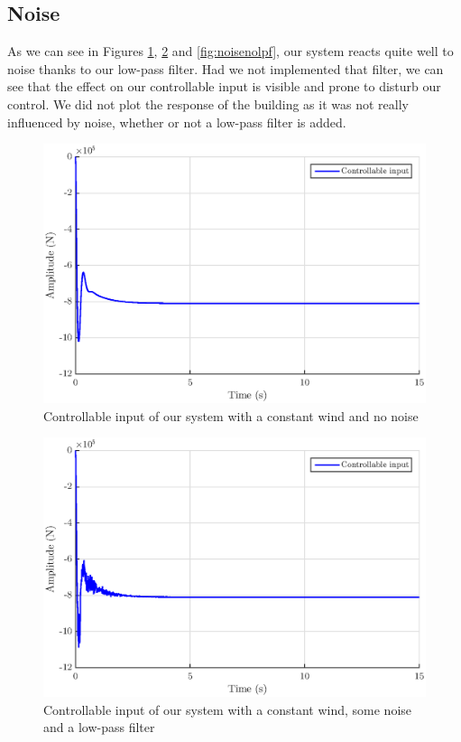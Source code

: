 \subsection{Noise}
As we can see in Figures \ref{fig:inputnonoise}, \ref{fig:noiselpf} and \ref{fig:noisenolpf}, our system reacts quite well to noise thanks to our low-pass filter. Had we not implemented that filter, we can see that the effect on our controllable input is visible and prone to disturb our control. We did not plot the response of the building as it was not really influenced by noise, whether or not a low-pass filter is added.
\begin{figure}[H]
    \centering
    \includegraphics[scale = 0.7]{resources/eps/input_nonoise.eps}
    \caption{Controllable input of our system with a constant wind and no noise}
    \label{fig:inputnonoise}
\end{figure}
\begin{figure}[H]
    \centering
    \includegraphics[scale = 0.7]{resources/eps/noise_lpf.eps}
    \caption{Controllable input of our system with a constant wind, some noise and a low-pass filter}
    \label{fig:noiselpf}
\end{figure}
